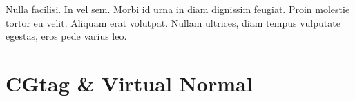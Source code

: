\begin{savequote}[75mm]
Nulla facilisi. In vel sem. Morbi id urna in diam dignissim feugiat. Proin molestie tortor eu velit. Aliquam erat volutpat. Nullam ultrices, diam tempus vulputate egestas, eros pede varius leo.
\end{savequote}

\chapter{CGtag \& Virtual Normal}
\setcounter{figure}{-1}
\setcounter{table}{-1}
\setcounter{section}{-1}


\cite{ireport}







